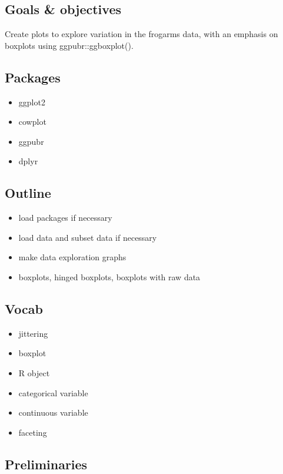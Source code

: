 \documentclass[]{book}
\providecommand{\tightlist}{%
  \setlength{\itemsep}{0pt}\setlength{\parskip}{0pt}}
\theoremstyle{definition}
\theoremstyle{definition}
\theoremstyle{definition}
\theoremstyle{remark}
\begin{document}
\subsection{Goals \& objectives}\label{goals-objectives}

Create plots to explore variation in the frogarms data, with an emphasis
on boxplots using ggpubr::ggboxplot().

\subsection{Packages}\label{packages-8}

\begin{itemize}
\tightlist
\item
  ggplot2
\item
  cowplot
\item
  ggpubr
\item
  dplyr
\end{itemize}

\subsection{Outline}\label{outline-3}

\begin{itemize}
\tightlist
\item
  load packages if necessary
\item
  load data and subset data if necessary
\item
  make data exploration graphs
\item
  boxplots, hinged boxplots, boxplots with raw data
\end{itemize}

\subsection{Vocab}\label{vocab}

\begin{itemize}
\tightlist
\item
  jittering
\item
  boxplot
\item
  R object
\item
  categorical variable
\item
  continuous variable
\item
  faceting
\end{itemize}

\subsection{Preliminaries}\label{preliminaries-2}
\end{document}
